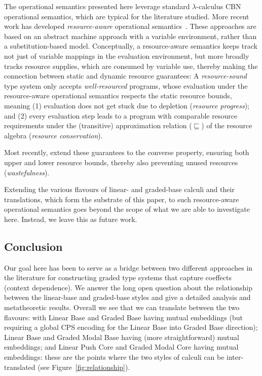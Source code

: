 The operational semantics presented here leverage standard $\lambda$-calculus CBN operational semantics,
which are typical for the literature studied.
More recent work has developed \emph{resource-aware} operational
semantics~\cite{grad, DBLP:journals/pacmpl/BianchiniDGZ23, DBLP:journals/corr/abs-2311-11795, DBLP:conf/ecoop/BianchiniDGZ23}. These approaches are based on an abstract machine
approach with a variable environment, rather than a substitution-based model.
Conceptually, a resource-aware semantics keeps track not just of variable mappings in the evaluation environment,
but more broadly tracks resource supplies, which are consumed by variable use,
thereby making the connection between static and dynamic resource guarantees:
A \emph{resource-sound} type system only accepts \emph{well-resourced} programs,
whose evaluation under the resource-aware operational semantics respects the static resource bounds,
meaning (1) evaluation does not get stuck due to depletion (\emph{resource progress});
and (2) every evaluation step leads to a program with comparable resource requirements
under the (transitive) approximation relation ($\sqsubseteq$) of the resource algebra (\emph{resource conservation}).

Most recently, \citet{DBLP:journals/corr/abs-2507-13792} extend these guarantees to the converse property,
ensuring both upper and lower resource bounds, thereby also preventing unused resources (\emph{wastefulness}).

Extending the various flavours of linear- and graded-base calculi and their translations,
which form the substrate of this paper, to such resource-aware operational semantics goes
beyond the scope of what we are able to investigate here. Instead, we leave this as future work.

\subsection{Conclusion}
\label{sec:conclusion}

Our goal here has been to serve as a bridge between two different approaches
in the literature for constructing graded type systems that capture coeffects (context dependence).
We answer the long open question about the relationship between
the linear-base and graded-base styles and give a detailed analysis and metatheoretic results. Overall we see that we can translate between
the two flavours: with Linear Base and Graded Base having mutual embeddings
(but requiring a global CPS encoding for the Linear Base into Graded Base direction);
Linear Base and Graded Modal Base having (more straightforward) mutual embeddings;
and Linear Push Core and Graded Modal Core having mutual embeddings: these are the points
where the two styles of calculi can be inter-translated (see Figure~\ref{fig:relationship}).

